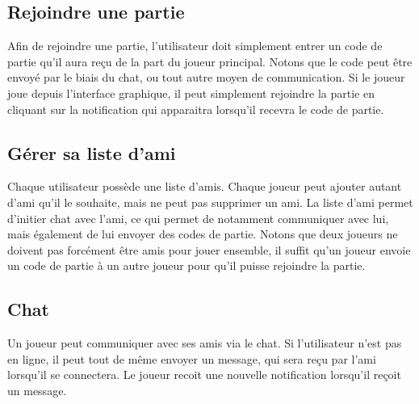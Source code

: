 \documentclass[../besoin_user.tex]{subfiles}
\begin{document}
\subsection{Rejoindre une partie}
Afin de rejoindre une partie, l'utilisateur doit simplement entrer un code de partie qu'il aura reçu de la part du joueur principal.
Notons que le code peut être envoyé par le biais du chat, ou tout autre moyen de communication.
Si le joueur joue depuis l'interface graphique, il peut simplement rejoindre la partie en cliquant sur la notification qui apparaitra lorsqu'il recevra le code de partie.


\subsection{Gérer sa liste d'ami}
Chaque utilisateur possède une liste d'amis. Chaque joueur peut ajouter autant d'ami qu'il le souhaite, mais ne peut pas supprimer un ami.
La liste d'ami permet d'initier chat avec l'ami, ce qui permet de notamment communiquer avec lui, mais également de lui envoyer des codes de partie.
Notons que deux joueurs ne doivent pas forcément être amis pour jouer ensemble, il suffit qu'un joueur envoie un code de partie à un autre joueur pour qu'il puisse rejoindre la partie.

\subsection{Chat}
Un joueur peut communiquer avec ses amis via le chat. Si l'utilisateur n'est pas en ligne, il peut tout de même envoyer un message, 
qui sera reçu par l'ami lorsqu'il se connectera.
Le joueur recoit une nouvelle notification lorsqu'il reçoit un message.
\end{document}
